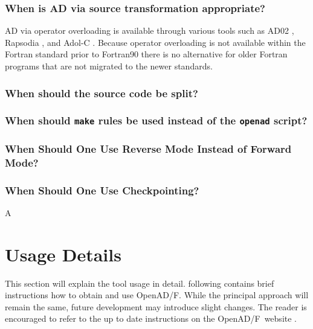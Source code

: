 \documentclass{book}
\newcommand{\OpenADF}{OpenAD/F}
\begin{document}
\subsection{When is AD via source transformation appropriate?}\label{sec:sourceTransformApprop}
AD via operator overloading is available through various tools such as 
AD02 \cite{ad02}, Rapsodia \cite{rapsodiaWeb}, and Adol-C \cite{adolcWeb}. 
Because operator overloading is not available within the Fortran standard prior to Fortran90 
there is no alternative for older Fortran programs that are not migrated to the newer standards.

\subsection{When should the source code be split?}\label{sec:SplittingSource}

\subsection{When should {\tt make} rules be used instead of the {\tt openad} script?}\label{sec:useMake}

\subsection{When Should One Use Reverse Mode Instead of Forward Mode?}\label{sec:reverseInsteadOfForward}

\subsection{When Should One Use Checkpointing?}\label{sec:Checkpointing}


A%
\chapter{Usage Details} \label{chap:Usage}
This section will explain the tool usage in detail.  following contains brief instructions how to obtain and use \OpenADF. 
While the principal approach will remain the same, future development may 
introduce slight changes. The reader is encouraged to refer to the 
up to date instructions on the \OpenADF\ website \cite{openadWeb}.

\end{document}

